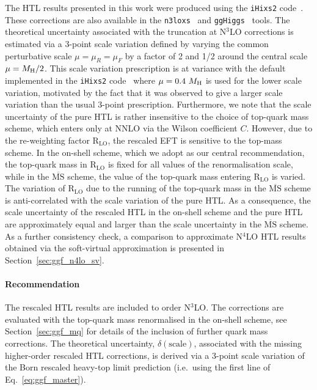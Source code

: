 The HTL results presented in this work were produced using the \texttt{iHixs2} code~\cite{Dulat:2018rbf}.
These corrections are also available in the \texttt{n3loxs}~\cite{Baglio:2022wzu} and  \texttt{ggHiggs}~\cite{Ball:2013bra,Bonvini:2014jma,Bonvini:2016frm,Ahmed:2016otz,Bonvini:2018ixe,Bonvini:2018iwt} tools.
The theoretical uncertainty associated with the truncation at N$^3$LO corrections is estimated via a 3-point scale variation defined by varying the common perturbative scale $\mu=\mu_R=\mu_F$ by a factor of 2 and 1/2 around the central scale $\mu=M_\mathrm{H}/2$.
This scale variation prescription is at variance with the default implemented in the \texttt{iHixs2} code~\cite{Dulat:2018rbf} where $\mu = 0.4\ M_\mathrm{H}$ is used for the lower scale variation, motivated by the fact that it was observed to give a larger scale variation than the usual 3-point prescription.
Furthermore, we note that the scale uncertainty of the pure HTL is rather insensitive to the choice of top-quark mass scheme, which enters only at NNLO via the Wilson coefficient $C$.
However, due to the re-weighting factor $\mathrm{R}_\mathrm{LO}$, the rescaled EFT is sensitive to the top-mass scheme.
In the on-shell scheme, which we adopt as our central recommendation, the top-quark mass in $\mathrm{R}_\mathrm{LO}$ is fixed for all values of the renormalisation scale, while in the $\overline{\mathrm{MS}}$ scheme, the value of the top-quark mass entering $\mathrm{R}_\mathrm{LO}$ is varied.
The variation of $\mathrm{R}_\mathrm{LO}$ due to the running of the top-quark mass in the $\overline{\mathrm{MS}}$ scheme is anti-correlated with the scale variation of the pure HTL.
As a consequence, the scale uncertainty of the rescaled HTL in the on-shell scheme and the pure HTL are approximately equal and larger than the scale uncertainty in the $\overline{\mathrm{MS}}$ scheme.
As a further consistency check, a comparison to approximate N$^4$LO HTL results obtained via the soft-virtual approximation is presented in Section~\ref{sec:ggf_n4lo_sv}.

\paragraph{Recommendation}
The rescaled HTL results are included to order N$^3$LO.
The corrections are evaluated with the top-quark mass renormalised in the on-shell scheme, see Section~\ref{sec:ggf_mq} for details of the inclusion of further quark mass corrections.
The theoretical uncertainty, $\delta(\mathrm{scale})$, associated with the missing higher-order rescaled HTL corrections, is derived via a 3-point scale variation of the Born rescaled heavy-top limit prediction (i.e.\ using the first line of Eq.~\eqref{eq:ggf_master}).

